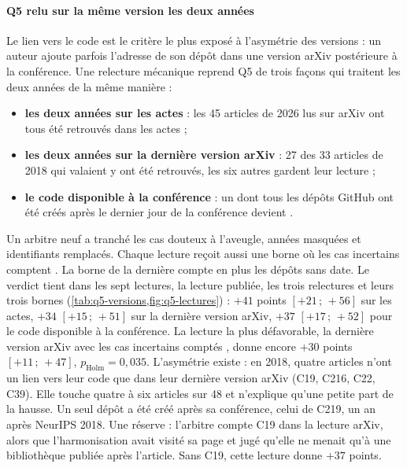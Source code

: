 \paragraph{Q5 relu sur la même version les deux années}
Le lien vers le code est le critère le plus exposé à l'asymétrie des versions : un auteur ajoute parfois
l'adresse de son dépôt dans une version arXiv postérieure à la conférence. Une relecture mécanique
reprend Q5 de trois façons qui traitent les deux années de la même
manière :
\begin{itemize}
  \item \textbf{les deux années sur les actes} : les 45 articles de 2026 lus sur arXiv ont tous été retrouvés
  dans les actes ;
  \item \textbf{les deux années sur la dernière version arXiv} : 27 des 33 articles de 2018 qui valaient
   y ont été retrouvés, les six autres gardent leur lecture ;
  \item \textbf{le code disponible à la conférence} : un  dont tous les dépôts GitHub ont été créés
  après le dernier jour de la conférence devient .
\end{itemize}
Un arbitre neuf a tranché les cas douteux à l'aveugle, années masquées et identifiants remplacés. Chaque lecture
reçoit aussi une borne où les cas incertains comptent . La borne de la dernière compte en plus
 les dépôts sans date. Le verdict tient dans les sept lectures, la lecture publiée, les trois relectures et leurs trois bornes
(\cref{tab:q5-versions,fig:q5-lectures}) : $+41$
points $[+21\,;\,+56]$ sur les actes, $+34$ $[+15\,;\,+51]$ sur la dernière version arXiv, $+37$
$[+17\,;\,+52]$ pour le code disponible à la conférence. La lecture la plus défavorable, la dernière version
arXiv avec les cas incertains comptés , donne encore $+30$ points $[+11\,;\,+47]$,
$p_{\text{Holm}} = 0{,}035$. L'asymétrie existe : en 2018, quatre articles n'ont un lien vers leur code que
dans leur dernière version arXiv (C19, C216, C22, C39). Elle touche quatre à six articles sur 48 et n'explique
qu'une petite part de la hausse. Un seul dépôt a été créé après sa conférence, celui de C219, un an après
NeurIPS 2018. Une réserve : l'arbitre compte C19  dans la lecture arXiv, alors que l'harmonisation avait
visité sa page et jugé qu'elle ne menait qu'à une bibliothèque publiée après l'article. Sans C19, cette lecture
donne $+37$ points.



